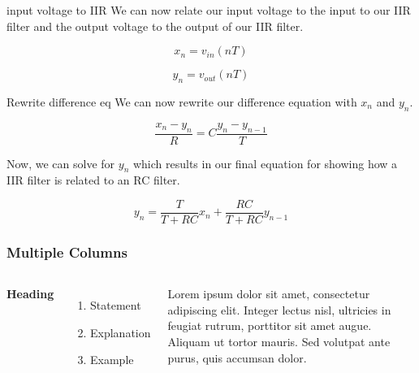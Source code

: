 \documentclass{beamer}
\begin{document}
\begin{frame}
\begin{block}{input voltage to IIR}
We can now relate our input voltage to the input to our IIR filter and the output voltage to the output of our IIR filter.

\begin{equation}\label{IIRxn}
x_n=v_{in}(nT)
\end{equation}

\begin{equation}\label{yn_out}
y_n=v_{out}(nT)
\end{equation}
\end{block}
\end{frame}

\begin{frame}
\begin{block}{Rewrite difference eq}
We can now rewrite our difference equation with $x_n$ and $y_n$.

\begin{equation}\label{diff_xn}
\frac{x_n-y_n}{R}=C\frac{y_n-y_{n-1}}{T}
\end{equation}

Now, we can solve for $y_n$ which results in our final equation for showing how a IIR filter is related to an RC filter.

\begin{equation}\label{IIR_RC}
y_n=\frac{T}{T+RC}x_n+\frac{RC}{T+RC}y_{n-1}
\end{equation}
\end{block}
\end{frame}

%

\begin{frame}
\frametitle{Multiple Columns}
\begin{columns}[c] %

\textbf{Heading}
\begin{enumerate}
\item Statement
\item Explanation
\item Example
\end{enumerate}

Lorem ipsum dolor sit amet, consectetur adipiscing elit. Integer lectus nisl, ultricies in feugiat rutrum, porttitor sit amet augue. Aliquam ut tortor mauris. Sed volutpat ante purus, quis accumsan dolor.

\end{columns}
\end{frame}
\end{document}
